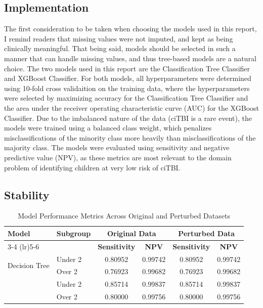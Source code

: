 \documentclass[10pt,letterpaper]{article}
\begin{document}
\subsection{Implementation}

The first consideration to be taken when choosing the models used in this report, I remind readers that missing values were not imputed, and kept as being clinically meaningful. That being said, models should be selected in such a manner that can handle missing values, and thus tree-based models are a natural choice. The two models used in this report are the Classification Tree Classifier and XGBoost Classifier. For both models, all hyperparameters were determined using 10-fold cross validaition on the training data, where the hyperparameters were selected by maximizing accuracy for the Classification Tree Classifier and the area under the receiver operating characteristic curve (AUC) for the XGBoost Classifier. Due to the imbalanced nature of the data (ciTBI is a rare event), the models were trained using a balanced class weight, which penalizes misclassifications of the minority class more heavily than misclassifications of the majority class. The models were evaluated using sensitivity and negative predictive value (NPV), as these metrics are most relevant to the domain problem of identifying children at very low risk of ciTBI.


\subsection{Stability}



\begin{table}[htbp]
\centering
\caption{Model Performance Metrics Across Original and Perturbed Datasets}
\label{tab:model_comparison}
\begin{tabular}{llcccc}
\toprule
\multirow{2}{*}{\textbf{Model}} & \multirow{2}{*}{\textbf{Subgroup}} & \multicolumn{2}{c}{\textbf{Original Data}} & \multicolumn{2}{c}{\textbf{Perturbed Data}} \\
\cmidrule(lr){3-4} \cmidrule(lr){5-6}
& & \textbf{Sensitivity} & \textbf{NPV} & \textbf{Sensitivity} & \textbf{NPV} \\
\midrule
\multirow{2}{*}{Decision Tree} 
  & Under 2 & 0.80952 & 0.99742 & 0.80952 & 0.99742 \\
  & Over 2  & 0.76923 & 0.99682 & 0.76923 & 0.99682 \\
\addlinespace
\multirow{2}{*}{XGBoost} 
  & Under 2 & 0.85714 & 0.99837 & 0.85714 & 0.99837 \\
  & Over 2  & 0.80000 & 0.99756 & 0.80000 & 0.99756 \\
\bottomrule
\end{tabular}
\end{table}
\end{document}
